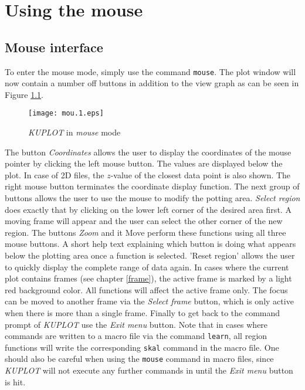 
\chapter{Using the mouse \label{mouse}}

\section{Mouse interface \label{mouse-interface}}

To enter the mouse mode, simply use the command {\tt mouse}. The
plot window will now contain a number off buttons in addition to the
view graph as can be seen in Figure \ref{mou-fig1}.
%
\begin{figure}[!b]
   \centering
   \texttt{[image: mou.1.eps]}
   \caption{{\it KUPLOT} in {\it mouse} mode}
   \label{mou-fig1}
\end{figure}
%
The button {\it Coordinates} allows the user to display the
coordinates of the mouse pointer by clicking the left mouse button.
The values are displayed below the plot. In case of 2D files, the
$z$-value of the closest data point is also shown. The right mouse
button terminates the coordinate display function. The next group of
buttons allows the user to use the mouse to modify the potting area.
{\it Select region} does exactly that by clicking on the lower left
corner of the desired area first. A moving frame will appear and the
user can select the other corner of the new region. The buttons {\it
Zoom} and {it Move} perform these functions using all three mouse
buttons. A short help text explaining which button is doing what
appears below the plotting area once a function is selected. 'Reset
region' allows the user to quickly display the complete range of
data again. In cases where the current plot contains frames (see
chapter \ref{frame}), the active frame is marked by a light red
background color. All functions will affect the active frame only.
The focus can be moved to another frame via the {\it Select frame}
button, which is only active when there is more than a single frame.
Finally to get back to the command prompt of {\it KUPLOT} use the
{\it Exit menu} button. Note that in cases where commands are
written to a macro file via the command {\tt learn}, all region
functions will write the corresponding {\tt skal} command in the
macro file. One should also be careful when using the {\tt mouse}
command in macro files, since {\it KUPLOT} will not execute any
further commands in until the {\it Exit menu} button is hit.
\par

